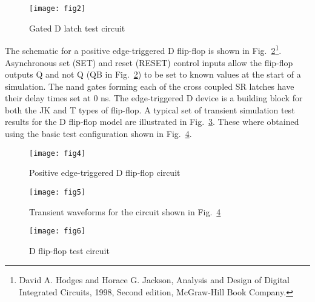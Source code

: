 \begin{figure}[ht]
  \centering
  \texttt{[image: fig2]}
        \caption{Gated D latch test circuit}
        \label{fig:fig2}
\end{figure}


The schematic for a positive edge-triggered D flip-flop is shown in
Fig.~\ref{fig:fig4}\footnote{David A. Hodges and Horace G. Jackson,
Analysis and Design of Digital Integrated Circuits, 1998, Second
edition, McGraw-Hill Book Company.}. Asynchronous set (SET) and reset
(RESET) control inputs allow the flip-flop outputs Q and not Q (QB in
Fig.~\ref{fig:fig4}) to be set to known values at the start of a
simulation. The nand gates forming each of the cross coupled SR
latches have their delay times set at 0 ns. The edge-triggered D
device is a building block for both the JK and T types of flip-flop.
A typical set of transient simulation test results for the D flip-flop
model are illustrated in Fig.~\ref{fig:fig5}.  These where obtained
using the basic test configuration shown in Fig.~\ref{fig:fig6}.

\begin{figure}[ht]
  \centering
	\texttt{[image: fig4]}
        \caption{Positive edge-triggered D flip-flop circuit}
        \label{fig:fig4}
\end{figure} 

\begin{figure}[ht]
  \centering
  \texttt{[image: fig5]}
  \caption{Transient waveforms for the circuit shown in Fig.~\ref{fig:fig6}}
  \label{fig:fig5}
\end{figure}

\begin{figure}[ht]
  \centering
  \texttt{[image: fig6]}
  \caption{D flip-flop test circuit}
  \label{fig:fig6}
\end{figure}

\FloatBarrier


